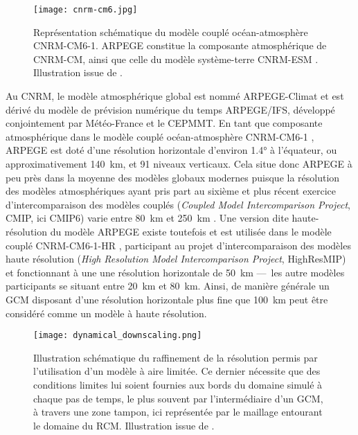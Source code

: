 \documentclass[../main.tex]{subfiles}
\begin{document}
\begin{figure}[t]
    \centering
    \texttt{[image: cnrm-cm6.jpg]}
    \caption{Représentation schématique du modèle couplé océan-atmosphère CNRM-CM6-1. \hbox{ARPEGE} constitue la composante atmosphérique de CNRM-CM, ainsi que celle du modèle système-terre CNRM-ESM \parencite{seferian_evaluation_2019}. Illustration issue de \cite{voldoire_evaluation_2019}.}
    \label{fig:cnrm-cm6}
\end{figure}

Au CNRM, le modèle atmosphérique global est nommé ARPEGE-Climat \parencite{deque_arpege_1994} et est dérivé du modèle de prévision numérique du temps ARPEGE/IFS, développé conjointement par Météo-France et le CEPMMT. En tant que composante atmosphérique dans le modèle couplé océan-atmosphère \nolinebreak CNRM-CM6-1
\parencite{voldoire_evaluation_2019}, ARPEGE est doté d'une résolution horizontale d'environ \ang{1.4} à l'équateur, ou approximativement \SI{140}{\kilo\metre}, et \num{91} niveaux verticaux. Cela situe donc ARPEGE à peu près dans la moyenne des modèles globaux modernes puisque la résolution des modèles atmosphériques ayant pris part au sixième et plus récent exercice d'intercomparaison des modèles couplés (\textit{Coupled Model Intercomparison Project}, CMIP, ici CMIP6)
\parencite{eyring_overview_2016} varie entre \SI{80}{\kilo\metre} et \SI{250}{\kilo\metre} \parencite{ipcc_annex_2021}. Une version dite haute-résolution du modèle ARPEGE existe toutefois et est utilisée dans le modèle couplé CNRM-CM6-1-HR \parencite{saint-martin_tracking_2021}, participant au projet d'intercomparaison des modèles haute résolution (\textit{High Resolution Model Intercomparison Project}, HighResMIP) \parencite{haarsma_high_2016} et fonctionnant à une une résolution horizontale de \SI{50}{\kilo\metre} ---~les autre modèles participants se situant entre \SI{20}{\kilo\metre} et \SI{80}{\kilo\metre}. Ainsi, de manière générale un GCM disposant d'une résolution horizontale plus fine que \SI{100}{\kilo\metre} peut être considéré comme un modèle à haute résolution.

\begin{figure}[t]
    \centering
    \texttt{[image: dynamical\_downscaling.png]}
    \caption{Illustration schématique du raffinement de la résolution permis par l'utilisation d'un modèle à aire limitée. Ce dernier nécessite que des conditions limites lui soient fournies aux bords du domaine simulé à chaque pas de temps, le plus souvent par l'intermédiaire d'un GCM, à travers une zone tampon, ici représentée par le maillage entourant le domaine du RCM. Illustration issue de \hbox{\cite{giorgi_regional_2015}}.}
    \label{fig:dynamical_downscaling}
\end{figure}
\end{document}
